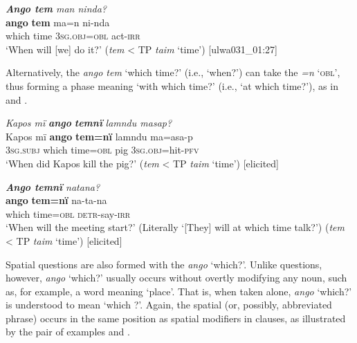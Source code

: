 \ea%
    \label{ex:syntax:39}
          \textit{\textbf{Ango tem} man ninda?}\\
\gll    \textbf{ango}  \textbf{tem}  ma=n      ni-nda\\
    which  time  3\textsc{sg.obj=obl}  act-\textsc{irr}\\
\glt `When will [we] do it?’ (\textit{tem} < TP \textit{taim} ‘time’) [ulwa031\_01:27]
\z

Alternatively, the  \textit{ango tem} ‘which time?’ (i.e., ‘when?’) can take the  \textit{=n} ‘\textsc{obl}’, thus forming a phase meaning ‘with which time?’ (i.e., ‘at which time?’), as in  and .

\ea%
    \label{ex:syntax:40}
          \textit{Kapos mï} \textbf{\textit{ango}} \textbf{\textit{temnï}} \textit{lamndu masap?}\\
\gll    Kapos  mï      \textbf{ango}  \textbf{tem=nï}  lamndu  ma=asa-p\\
    [name]  \textsc{3sg.subj}  which  time=\textsc{obl}  pig      \textsc{3sg.obj}=hit-\textsc{pfv}\\
\glt `When did Kapos kill the pig?’ (\textit{tem} < TP \textit{taim} ‘time’) [elicited]
\z

\ea%
    \label{ex:syntax:41}
          \textit{\textbf{Ango temnï} natana?}\\
\gll    \textbf{ango}  \textbf{tem=nï}  na-ta-na\\
    which  time=\textsc{obl}  \textsc{detr}{}-say-\textsc{irr}\\
\glt `When will the meeting start?’ (Literally ‘[They] will at which time talk?’) (\textit{tem} < TP \textit{taim} ‘time’) [elicited]
\z

Spatial questions are also formed with the  \textit{ango} ‘which?’. Unlike  questions, however, \textit{ango} ‘which?’ usually occurs without overtly modifying any noun, such as, for example, a word meaning ‘place’. That is, when taken alone, \textit{ango} ‘which?’ is understood to mean ‘which ?’. Again, the spatial  (or, possibly, abbreviated phrase) occurs in the same position as spatial modifiers in  clauses, as illustrated by the pair of examples  and .



